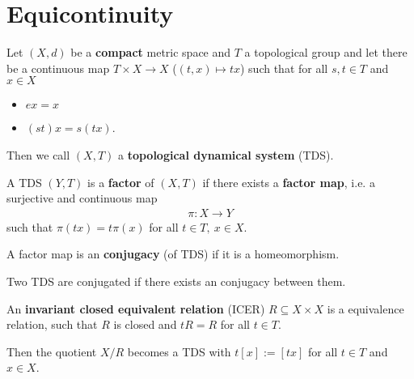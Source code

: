 \section{Equicontinuity}

\begin{frame}
	\begin{definition}
		Let $(X, d)$ be a \textbf{compact} metric space and $T$ a topological group and let there be a continuous map $T \times X \to X$ ($(t, x) \mapsto tx$) such that for all $s, t \in T$ and $x \in X$
		\begin{itemize}
			\item $ex = x$
			\item $(st)x = s(tx)$.
		\end{itemize}
		Then we call $(X, T)$ a \textbf{topological dynamical system} (TDS).
	\end{definition}
	\begin{overlayarea}{\textwidth}{3.5cm}
	\begin{minipage}{\textwidth}
	\end{minipage}
	\end{overlayarea}
\end{frame}

\begin{frame}
	\begin{definition}
		A TDS $(Y, T)$ is a \textbf{factor} of $(X, T)$ if there exists a \textbf{factor map}, i.e. a surjective and continuous map
		\begin{align*}
			\pi: X \to Y
		\end{align*}
		such that $\pi(tx) = t\pi(x)$ for all $t \in T,\ x \in X$.\pause
		
		A factor map is an \textbf{conjugacy} (of TDS) if it is a homeomorphism.
		
		Two TDS are conjugated if there exists an conjugacy between them.\pause
	\end{definition}
	\begin{definition}
		An \textbf{invariant closed equivalent relation} (ICER) $R \subseteq X \times X$ is a equivalence relation, such that $R$ is closed and $tR = R$ for all $t \in T$.\pause
		
		Then the quotient $X/R$ becomes a TDS with $t[x] := [tx]$ for all $t \in T$ and $x \in X$.
	\end{definition}
\end{frame}

